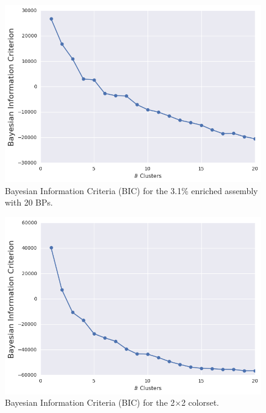 \begin{figure}[h!]
\centering
\includegraphics[width=0.87\linewidth]{figures/results/model-select/assm-31-20BPs/bic-combined-U238-capture-1}
\vspace{2mm}
\caption[Silhouette coefficients for the 3.1\% enriched assembly with 20 BPs]{Bayesian Information Criteria (BIC) for the 3.1\% enriched assembly with 20 \acp{BP}.}
\label{fig:chap11-assm-31-20BPs-bic}
\end{figure}

\clearpage

\begin{figure}[h!]
\centering
\includegraphics[width=0.87\linewidth]{figures/results/model-select/2x2/bic-combined-U238-capture-1}
\vspace{2mm}
\caption[BIC for the 2$\times$2 colorset]{Bayesian Information Criteria (BIC) for the 2$\times$2 colorset.}
\label{fig:chap11-2x2-bic}
\end{figure}

\clearpage

